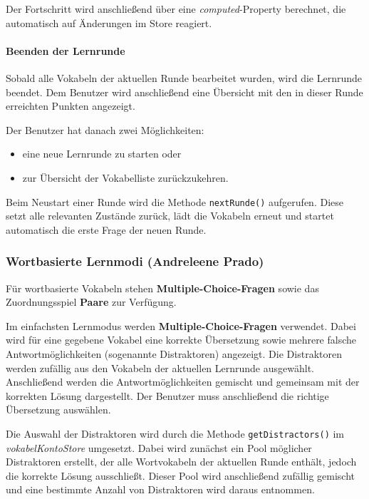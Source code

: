 Der Fortschritt wird anschließend über eine \textit{computed}-Property berechnet, die automatisch auf Änderungen im Store reagiert.

\paragraph{Beenden der Lernrunde}

Sobald alle Vokabeln der aktuellen Runde bearbeitet wurden, wird die Lernrunde beendet.
Dem Benutzer wird anschließend eine Übersicht mit den in dieser Runde erreichten Punkten angezeigt.

Der Benutzer hat danach zwei Möglichkeiten:
\begin{itemize}
    \item eine neue Lernrunde zu starten oder
    \item zur Übersicht der Vokabelliste zurückzukehren.
\end{itemize}

Beim Neustart einer Runde wird die Methode \texttt{nextRunde()} aufgerufen.
Diese setzt alle relevanten Zustände zurück, lädt die Vokabeln erneut und startet automatisch die erste Frage der neuen Runde.

\subsubsection{Wortbasierte Lernmodi (Andreleene Prado)}

Für wortbasierte Vokabeln stehen \textbf{Multiple-Choice-Fragen} sowie das Zuordnungsspiel \textbf{Paare} zur Verfügung. 

Im einfachsten Lernmodus werden \textbf{Multiple-Choice-Fragen} verwendet. 
Dabei wird für eine gegebene Vokabel eine korrekte Übersetzung sowie mehrere falsche Antwortmöglichkeiten (sogenannte Distraktoren) angezeigt.
Die Distraktoren werden zufällig aus den Vokabeln der aktuellen Lernrunde ausgewählt. 
Anschließend werden die Antwortmöglichkeiten gemischt und gemeinsam mit der korrekten Lösung dargestellt. 
Der Benutzer muss anschließend die richtige Übersetzung auswählen.

Die Auswahl der Distraktoren wird durch die Methode \texttt{getDistractors()} im \textit{vokabelKontoStore} umgesetzt. 
Dabei wird zunächst ein Pool möglicher Distraktoren erstellt, der alle Wortvokabeln der aktuellen Runde enthält, jedoch die korrekte Lösung ausschließt. 
Dieser Pool wird anschließend zufällig gemischt und eine bestimmte Anzahl von Distraktoren wird daraus entnommen.

